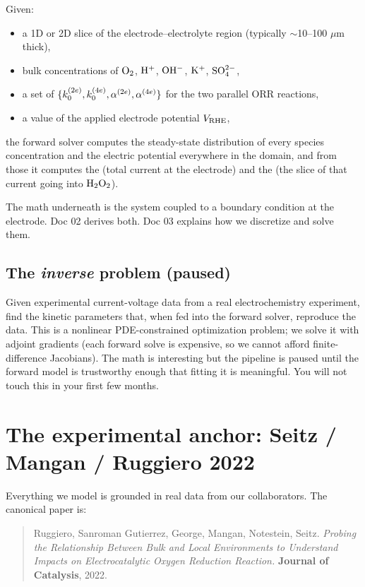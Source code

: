\documentclass[11pt]{article}
\begin{document}
Given:
\begin{itemize}[leftmargin=*]
  \item a 1D or 2D slice of the electrode--electrolyte region
        (typically $\sim$10--100 $\mu$m thick),
  \item bulk concentrations of $\mathrm{O_2}$, $\mathrm{H^+}$, $\mathrm{OH^-}$, $\mathrm{K^+}$,
        $\mathrm{SO_4^{2-}}$,
  \item a set of 
        $\{k_0^{(2e)}, k_0^{(4e)}, \alpha^{(2e)}, \alpha^{(4e)}\}$
        for the two parallel ORR reactions,
  \item a value of the applied electrode potential $V_{\mathrm{RHE}}$,
\end{itemize}
the forward solver computes the steady-state distribution of every
species concentration and the electric potential everywhere in the
domain, and from those it computes the 
(total current at the electrode) and the  (the slice of that current going into $\mathrm{H_2O_2}$).

The math underneath is the 
system coupled to a  boundary condition
at the electrode. Doc 02 derives both. Doc 03 explains how we
discretize and solve them.

\subsection{The \emph{inverse} problem (paused)}

Given experimental current-voltage data from a real electrochemistry
experiment, find the kinetic parameters that, when fed into the
forward solver, reproduce the data. This is a nonlinear PDE-constrained
optimization problem; we solve it with adjoint gradients (each forward
solve is expensive, so we cannot afford finite-difference Jacobians).
The math is interesting but the pipeline is paused until the forward
model is trustworthy enough that fitting it is meaningful. You will
not touch this in your first few months.

\section{The experimental anchor: Seitz / Mangan / Ruggiero 2022}

Everything we model is grounded in real data from our collaborators.
The canonical paper is:

\begin{quote}
\small
Ruggiero, Sanroman Gutierrez, George, Mangan, Notestein, Seitz.
\textit{Probing the Relationship Between Bulk and Local Environments
to Understand Impacts on Electrocatalytic Oxygen Reduction Reaction.}
\textbf{Journal of Catalysis}, 2022.
\end{quote}
\end{document}
